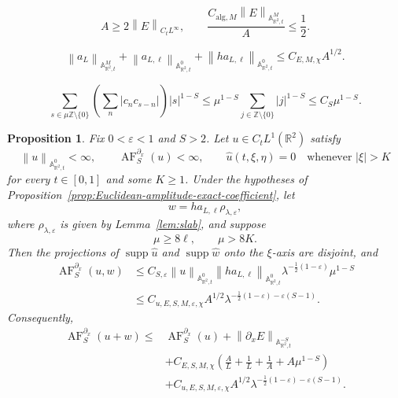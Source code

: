 \documentclass[10pt,a4paper]{amsart}
\newtheorem{proposition}{Proposition}
\newcommand{\A}{\mathbb A}
\newcommand{\R}{\mathbb R}
\newcommand{\Z}{\mathbb Z}
\newcommand{\abs}[1]{\left\lvert #1\right\rvert}
\newcommand{\eps}{\varepsilon}
\newcommand{\la}{\lambda}
\newcommand{\norm}[1]{\left\lVert #1\right\rVert}
\newcommand{\supp}{\operatorname{supp}}
\begin{document}
\begin{equation}
   A\geq2\norm E_{C_tL^\infty},
   \qquad
   \frac{C_{\mathrm{alg},M}\norm E_{\A^M_{\R^2,t}}}{A}\leq\frac12.
\end{equation}

\begin{equation}\label{eq:Euclidean-amplitude-Wiener-bounds}
 \norm{a_L}_{\A^M_{\R^2,t}}
 +\norm{a_{L,\ell}}_{\A^0_{\R^2,t}}
 +\norm{h a_{L,\ell}}_{\A^0_{\R^2,t}}
 \leq C_{E,M,\chi}A^{1/2}.
\end{equation}

\begin{equation}\label{eq:Euclidean-frequency-sum-bound}
   \sum_{s\in\mu\Z\setminus\{0\}}
      \left(\sum_n\abs{c_nc_{s-n}}\right)\abs{s}^{1-S}
   \leq\mu^{1-S}\sum_{j\in\Z\setminus\{0\}}\abs j^{1-S}
   \leq C_S\mu^{1-S}.
\end{equation}

\begin{proposition}
\label{prop:Euclidean-mixed-absolute}
Fix $0<\eps<1$ and $S>2$.  Let $u\in C_tL^1(\R^2)$ satisfy
\[
   \norm{u}_{\A^0_{\R^2,t}}<\infty,
   \qquad
   \operatorname{AF}^{\partial_x}_S(u)<\infty,
   \qquad
   \widehat u(t,\xi,\eta)=0\quad\text{whenever }\abs\xi>K
\]
for every $t\in[0,1]$ and some $K\geq1$.  Under the hypotheses of
Proposition~\ref{prop:Euclidean-amplitude-exact-coefficient}, let
\[
   w=h a_{L,\ell}\rho_{\la,\eps},
\]
where $\rho_{\la,\eps}$ is given by Lemma~\ref{lem:slab}, and suppose
\begin{equation}\label{eq:Euclidean-mixed-separation}
   \mu\geq8\ell,
   \qquad
   \mu>8K.
\end{equation}
Then the projections of $\supp\widehat u$ and $\supp\widehat w$ onto the
$\xi$-axis are disjoint, and
\begin{equation}\label{eq:Euclidean-mixed-absolute}
\begin{split}
 \operatorname{AF}^{\partial_x}_S(u,w)
 &\leq C_{S,\eps}
   \norm{u}_{\A^0_{\R^2,t}}
   \norm{h a_{L,\ell}}_{\A^0_{\R^2,t}}
   \la^{-\frac12(1-\eps)}\mu^{1-S}\\
 &\leq C_{u,E,S,M,\eps,\chi}A^{1/2}
   \la^{-\frac12(1-\eps)-\eps(S-1)}.
\end{split}
\end{equation}
Consequently,
\begin{equation}\label{eq:Euclidean-combined-absolute}
\begin{split}
 \operatorname{AF}^{\partial_x}_S(u+w)
 \leq{}&\operatorname{AF}^{\partial_x}_S(u)
   +\norm{\partial_xE}_{\A^{-S}_{\R^2,t}}\\
 &+C_{E,S,M,\chi}\left(
       \frac A L+\frac1L+\frac1A+A\mu^{1-S}\right)\\
 &+C_{u,E,S,M,\eps,\chi}A^{1/2}
   \la^{-\frac12(1-\eps)-\eps(S-1)}.
\end{split}
\end{equation}
\end{proposition}
\end{document}

